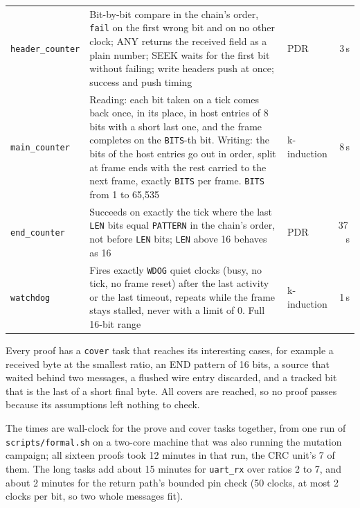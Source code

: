 \documentclass[11pt,a4paper]{article}
\newcommand{\sig}[1]{\texttt{#1}}
\begin{document}
\begin{center}
\begin{tabularx}{\linewidth}{@{}l L l r@{}}
\sig{header\_counter} & Bit-by-bit compare in the chain's order, \sig{fail} on the first wrong bit and on no other clock; ANY returns the received field as a plain number; SEEK waits for the first bit without failing; write headers push at once; success and push timing & PDR & 3\,s \\
\sig{main\_counter} & Reading: each bit taken on a tick comes back once, in its place, in host entries of 8 bits with a short last one, and the frame completes on the \sig{BITS}-th bit. Writing: the bits of the host entries go out in order, split at frame ends with the rest carried to the next frame, exactly \sig{BITS} per frame. \sig{BITS} from 1 to 65,535 & k-induction & 8\,s \\
\sig{end\_counter} & Succeeds on exactly the tick where the last \sig{LEN} bits equal \sig{PATTERN} in the chain's order, not before \sig{LEN} bits; \sig{LEN} above 16 behaves as 16 & PDR & 37\,s \\
\sig{watchdog} & Fires exactly \sig{WDOG} quiet clocks (busy, no tick, no frame reset) after the last activity or the last timeout, repeats while the frame stays stalled, never with a limit of 0. Full 16-bit range & k-induction & 1\,s \\
\bottomrule
\end{tabularx}
\end{center}

Every proof has a \sig{cover} task that reaches its interesting cases, for example a received byte at the smallest ratio, an END pattern of 16 bits, a source that waited behind two messages, a flushed wire entry discarded, and a tracked bit that is the last of a short final byte. All covers are reached, so no proof passes because its assumptions left nothing to check.

The times are wall-clock for the prove and cover tasks together, from one run of \sig{scripts/formal.sh} on a two-core machine that was also running the mutation campaign; all sixteen proofs took 12 minutes in that run, the CRC unit's 7 of them. The long tasks add about 15 minutes for \sig{uart\_rx} over ratios 2 to 7, and about 2 minutes for the return path's bounded pin check (50 clocks, at most 2 clocks per bit, so two whole messages fit).
\end{document}
